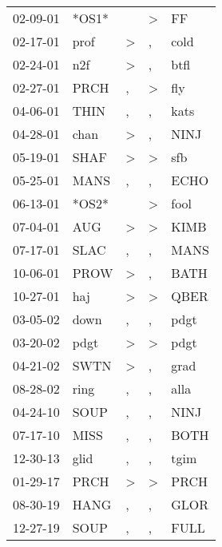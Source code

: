 \begin{supertabular}{lllll}
 02-09-01 &  *OS1* &                  &  \textgreater &     FF \\
 02-17-01 &   prof &     \textgreater &             , &   cold \\
 02-24-01 &    n2f &     \textgreater &             , &   btfl \\
 02-27-01 &   PRCH &                , &  \textgreater &    fly \\
 04-06-01 &   THIN &                , &             , &   kats \\
 04-28-01 &   chan &     \textgreater &             , &   NINJ \\
 05-19-01 &   SHAF &     \textgreater &  \textgreater &    sfb \\
 05-25-01 &   MANS &                , &             , &   ECHO \\
 06-13-01 &  *OS2* &                  &  \textgreater &   fool \\
 07-04-01 &    AUG &     \textgreater &  \textgreater &   KIMB \\
 07-17-01 &   SLAC &                , &             , &   MANS \\
 10-06-01 &   PROW &     \textgreater &             , &   BATH \\
 10-27-01 &    haj &     \textgreater &  \textgreater &   QBER \\
 03-05-02 &   down &                , &             , &   pdgt \\
 03-20-02 &   pdgt &     \textgreater &  \textgreater &   pdgt \\
 04-21-02 &   SWTN &     \textgreater &             , &   grad \\
 08-28-02 &   ring &                , &             , &   alla \\
 04-24-10 &   SOUP &                , &             , &   NINJ \\
 07-17-10 &   MISS &                , &             , &   BOTH \\
 12-30-13 &   glid &                , &             , &   tgim \\
 01-29-17 &   PRCH &     \textgreater &  \textgreater &   PRCH \\
 08-30-19 &   HANG &                , &             , &   GLOR \\
 12-27-19 &   SOUP &                , &             , &   FULL \\
\end{supertabular}
